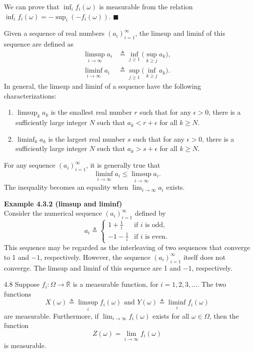 We can prove that $\inf_i f_i(\omega)$ is measurable from the relation $\inf_i f_i(\omega) = -\sup_i (-f_i(\omega))$. \hfill $\blacksquare$

Given a sequence of real numbers $(a_i)_{i=1}^{\infty}$, the limsup and liminf of this sequence are defined as
\begin{align*}
\limsup_{i \to \infty} a_i &\triangleq \inf_{j \ge 1} \Big( \sup_{k \ge j} a_k \Big), \\
\liminf_{i \to \infty} a_i &\triangleq \sup_{j \ge 1} \Big( \inf_{k \ge j} a_k \Big).
\end{align*}
In general, the limsup and liminf of a sequence have the following characterizations:
\begin{enumerate}[label=(\alph*)]
    \item $\limsup_k a_k$ is the smallest real number $r$ such that for any $\epsilon > 0$, there is a sufficiently large integer $N$ such that $a_k < r + \epsilon$ for all $k \ge N$.
    \item $\liminf_k a_k$ is the largest real number $s$ such that for any $\epsilon > 0$, there is a sufficiently large integer $N$ such that $a_k > s + \epsilon$ for all $k \ge N$.
\end{enumerate}
For any sequence $(a_i)_{i=1}^{\infty}$, it is generally true that
\[
\liminf_{i \to \infty} a_i \le \limsup_{i \to \infty} a_i.
\]
The inequality becomes an equality when $\lim_{i \to \infty} a_i$ exists.

\textbf{Example 4.3.2 (limsup and liminf)} \\
Consider the numerical sequence $(a_i)_{i=1}^{\infty}$ defined by
\[
a_i \triangleq \begin{cases} 1 + \frac{1}{i} & \text{if } i \text{ is odd,} \\ -1 - \frac{1}{i} & \text{if } i \text{ is even.} \end{cases}
\]
This sequence may be regarded as the interleaving of two sequences that converge to 1 and $-1$, respectively. However, the sequence $(a_i)_{i=1}^{\infty}$ itself does not converge. The limsup and liminf of this sequence are 1 and $-1$, respectively.
\begin{thmbox}{4.8}
Suppose $f_i : \Omega \to \bar{\mathbb{R}}$ is a measurable function, for $i = 1, 2, 3, \dots$. The two functions
\[
X(\omega) \triangleq \limsup_i f_i(\omega) \text{ and } Y(\omega) \triangleq \liminf_i f_i(\omega)
\]
are measurable. Furthermore, if $\lim_{i \to \infty} f_i(\omega)$ exists for all $\omega \in \Omega$, then the function
\[
Z(\omega) = \lim_{i \to \infty} f_i(\omega)
\]
is measurable.
\end{thmbox}


